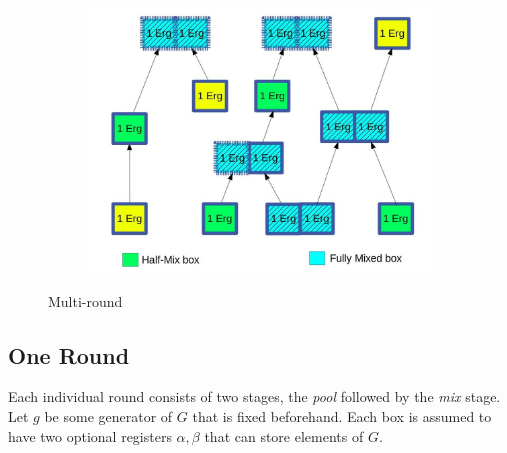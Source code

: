 \documentclass[runningheads]{llncs}
\begin{document}
\begin{figure}[h]
	\centering
	\begin{subfigure}{.6\textwidth}
		\centering
		\includegraphics[width=\linewidth]{ErgoMix}
	\end{subfigure}
	\caption{Multi-round \algname}
\label{fig:mixname}
\end{figure}


\subsection{One \algname Round}
Each individual \algname round consists of two stages, the {\em pool} followed by the {\em mix} stage. 
Let $g$ be some generator of $G$ that is fixed beforehand. Each box is assumed to have two optional registers $\alpha, \beta$ that can store elements of $G$.
\end{document}
